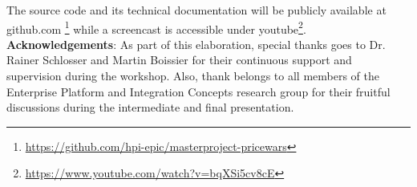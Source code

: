 The source code and its technical documentation will be publicly available at github.com \footnote{\url{https://github.com/hpi-epic/masterproject-pricewars}}
while a screencast is accessible under youtube\footnote{\url{https://www.youtube.com/watch?v=bqXSi5cv8cE}}.\\

\textbf{Acknowledgements}:
As part of this elaboration, special thanks goes to Dr. Rainer Schlosser and Martin Boissier for their continuous support and supervision during the workshop. Also, thank belongs to all members of the Enterprise Platform and Integration Concepts research group for their fruitful discussions during the intermediate and final presentation.